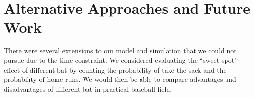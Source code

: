 \section{Alternative Approaches and Future Work}

There were several extensions to our model and simulation that we could not pursue due to the time constraint. We considered evaluating the ``sweet spot" effect of different bat by counting the probability of take the sack and the probability of home runs. We would then be able to compare advantages and disadvantages of different bat in practical baseball field. 